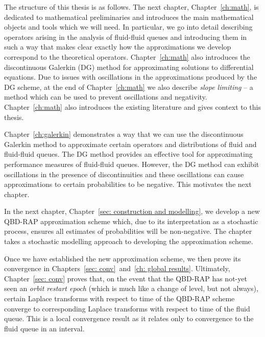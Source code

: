 The structure of this thesis is as follows. The next chapter, Chapter~\ref{ch:math}, is dedicated to mathematical preliminaries and introduces the main mathematical objects and tools which we will need. In particular, we go into detail describing operators arising in the analysis of fluid-fluid queues and introducing them in such a way that makes clear exactly how the approximations we develop correspond to the theoretical operators. Chapter~\ref{ch:math} also introduces the discontinuous Galerkin (DG) method for approximating solutions to differential equations. Due to issues with oscillations in the approximations produced by the DG scheme, at the end of Chapter~\ref{ch:math} we also describe \emph{slope limiting} -- a method which can be used to prevent oscillations and negativity. Chapter~\ref{ch:math} also introduces the existing literature and gives context to this thesis.

Chapter~\ref{ch:galerkin} demonstrates a way that we can use the discontinuous Galerkin method to approximate certain operators and distributions of fluid and fluid-fluid queues. The DG method provides an effective tool for approximating performance measures of fluid-fluid queues. However, the DG method can exhibit oscillations in the presence of discontinuities and these oscillations can cause approximations to certain probabilities to be negative. This motivates the next chapter.

In the next chapter, Chapter~\ref{sec: construction and modelling}, we develop a new QBD-RAP approximation scheme which, due to its interpretation as a stochastic process, ensures all estimates of probabilities will be non-negative. The chapter takes a stochastic modelling approach to developing the approximation scheme. 

Once we have established the new approximation scheme, we then prove its convergence in Chapters~\ref{sec: conv}~and~\ref{ch: global results}. Ultimately, Chapter~\ref{sec: conv} proves that, on the event that the QBD-RAP has not-yet seen an \emph{orbit restart epoch} (which is much like a change of level, but not always), certain Laplace transforms with respect to time of the QBD-RAP scheme converge to corresponding Laplace transforms with respect to time of the fluid queue. This is a local convergence result as it relates only to convergence to the fluid queue in an interval. 

